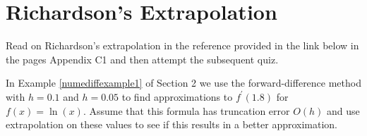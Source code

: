 \section{Richardson's Extrapolation}
\activities
Read on Richardson's extrapolation in the reference provided in the link below in the pages Appendix C1 and then attempt the subsequent quiz.
\begin{activity}[\cg Reading]
\end{activity}

\begin{example}\label{Richardsonsexample1}
In Example \ref{numediffexample1} of Section 2 we use the forward-difference method with $h=0.1$ and $h=0.05$ to find approximations to $f^{\prime}(1.8)$ for $f(x)=\ln (x)$. Assume that this formula has truncation error $O(h)$ and use extrapolation on these values to see if this results in a better approximation.
\end{example}

